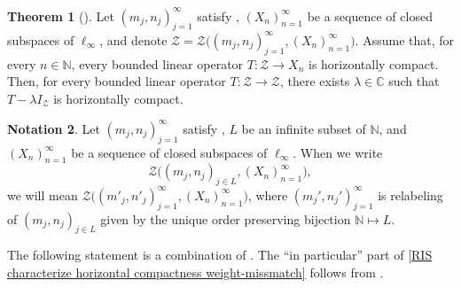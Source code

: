 \documentclass[11pt]{amsart}
\theoremstyle{definition}
\newtheorem{theorem}{Theorem}[section]
\newtheorem{notation}[theorem]{Notation}
\newcommand{\N}{\mathbb{N}}
\newcommand{\C}{\mathbb{C}}
\numberwithin{equation}{section}
\begin{document}
\begin{theorem}[\cite{zisimopoulou:2014}]
\label{scalar-plus-horizontally compact zisimopoulou}
    Let $(m_j,n_j)_{j=1}^\infty$ satisfy , $(X_n)_{n=1}^\infty$ be a sequence of closed subspaces of $\ell_\infty$, and denote $\mathcal{Z} = \mathcal{Z}\big((m_j,n_j)_{j=1}^\infty,(X_n)_{n=1}^\infty\big)$. Assume that, for every $n\in\N$, every bounded linear operator $T:\mathcal{Z}\to X_n$ is horizontally compact. Then, for every bounded linear operator $T:\mathcal{Z}\to\mathcal{Z}$, there exists $\lambda\in\C$ such that $T-\lambda I_\mathcal{Z}$ is horizontally compact.
\end{theorem}



\begin{notation}
Let $(m_j,n_j)_{j=1}^\infty$ satisfy , $L$ be an infinite subset of $\N$, and $(X_n)_{n=1}^\infty$ be a sequence of closed subspaces of $\ell_\infty$. When we write
\[\mathcal{Z}\big((m_j,n_j)_{j\in L},(X_n)_{n=1}^\infty\big),\]
we will mean $\mathcal{Z}\big((m'_j,n'_j)_{j=1}^\infty,(X_n)_{n=1}^\infty\big)$, where $(m_j',n_j')_{j=1}^\infty$ is relabeling of $(m_j,n_j)_{j\in L}$ given by the unique order preserving bijection $\N\mapsto L$.
\end{notation}

The following statement is a combination of \cite[Corollary 5.12 and Proposition 5.14]{zisimopoulou:2014}. The ``in particular'' part of \cref{RIS characterize horizontal compactness weight-missmatch} follows from \cite[Proposition 2.5]{argyros:haydon:2011}.
\end{document}
